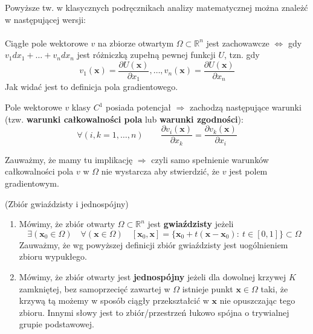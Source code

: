 \begin{uwg}
	Powyższe tw. w klasycznych podręcznikach analizy matematycznej można znależć w następującej wersji:
	\\
	\\ Ciągłe pole wektorowe $v$ na zbiorze otwartym $\Omega\subset\mathbb{R}^{n}$ jest zachowawcze $\Leftrightarrow$ gdy $v_{1}dx_{1}+\ldots+v_{n}dx_{n}$ jest różniczką zupełną pewnej funkcji $U$, tzn. gdy $$v_{1}(\mathbf{x})=\frac{\partial U(\mathbf{x})}{\partial x_{1}},\ldots,v_{n}(\mathbf{x})=\frac{\partial U(\mathbf{x})}{\partial x_{n}}$$ Jak widać jest to definicja pola gradientowego.
\end{uwg}

\begin{ft}
	Pole wektorowe $v$ klasy $C^{1}$ posiada potencjał $\Rightarrow$ zachodzą następujące warunki (tzw. \textbf{warunki całkowalności pola} lub \textbf{warunki zgodności}): $$\forall(i,k=1,\ldots,n)\qquad\frac{\partial v_{i}(\mathbf{x})}{\partial x_{k}}=\frac{\partial v_{k}(\mathbf{x})}{\partial x_{i}}$$
\end{ft}

\begin{uwg}
	Zauważmy, że mamy tu implikację $\Rightarrow$ czyli samo spełnienie warunków całkowalności pola $v$ w $\Omega$ nie wystarcza aby stwierdzić, że $v$ jest polem gradientowym.
\end{uwg}

\begin{df}{(Zbiór gwiaździsty i jednospójny)}\\
	\begin{enumerate}
		\item
		Mówimy, że zbiór otwarty $\Omega\subset\mathbb{R}^{n}$ jest \textbf{gwiaździsty} jeżeli $$\exists(\mathbf{x}_{0}\in\Omega)\quad\forall(\mathbf{x}\in\Omega)\quad[\mathbf{x}_{0},\mathbf{x}]=\{\mathbf{x}_{0}+t(\mathbf{x}-\mathbf{x}_{0}):\ t\in[0,1]\}\subset\Omega$$ Zauważmy, że wg powyższej definicji zbiór gwiaździsty jest uogólnieniem zbioru wypukłego.
		\item
		Mówimy, że zbiór otwarty jest \textbf{jednospójny} jeżeli dla dowolnej krzywej $K$ zamkniętej, bez samoprzecięć zawartej w $\Omega$ istnieje punkt $\mathbf{x}\in\Omega$ taki, że krzywą tą możemy w sposób ciągły przekształcić w $\mathbf{x}$ nie opuszczając tego zbioru. Innymi słowy jest to zbiór/przestrzeń łukowo spójna o trywialnej grupie podstawowej.
	\end{enumerate}
\end{df}

